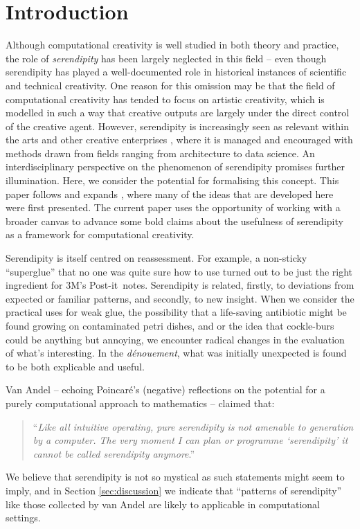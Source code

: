 \section{Introduction}

Although computational creativity is well studied in both theory and
practice, the role of \emph{serendipity} has been largely neglected
in this field -- even though serendipity has played a well-documented
role in historical instances of scientific and technical creativity.
One reason for this omission may be that the field of computational
creativity has tended to focus on artistic creativity, which is modelled in such a way that creative outputs are largely under the direct control of the creative agent.  However,  
serendipity is increasingly seen as relevant within the arts
\cite{mckay-serendipity} and other creative enterprises
\cite{kakko2009homo,engineering-serendipity}, where it is managed and
encouraged with methods drawn from fields ranging from architecture to data science.
%
An interdisciplinary perspective on the phenomenon of serendipity
promises further illumination.  Here, we consider the potential for
formalising this concept.  This paper follows and expands , where many of the ideas that are developed here were first presented.  The current paper uses the opportunity of working with a broader canvas to advance some bold claims about the usefulness of serendipity as a framework for computational creativity.

Serendipity is itself centred on reassessment.  For example, a non-sticky
``superglue'' that no one was quite sure how to use turned out to be
just the right ingredient for 3M's Post-it\texttrademark\ notes.
%
Serendipity is related, firstly, to deviations from expected or
familiar patterns, and secondly, to new insight.
%
When we consider the practical uses for weak glue, the possibility
that a life-saving antibiotic might be found growing on contaminated
petri dishes, and or the idea that cockle-burs could be anything but
annoying, we encounter radical changes in the evaluation of what's
interesting.  In the \emph{d\'enouement}, what was initially
unexpected is found to be both explicable and useful.

Van Andel \citeyear{van1994anatomy} -- echoing Poincar\'e's
\citeyear{poincare1910creation} (negative) reflections on the potential
for a purely computational approach to mathematics -- claimed that:
\begin{quote}
``\emph{Like all intuitive operating, pure serendipity is not amenable
    to generation by a computer.  The very moment I can plan or
    programme `serendipity' it cannot be called serendipity
    anymore}.'' \cite{van1994anatomy}
\end{quote}
We believe that serendipity is not so mystical as such statements
might seem to imply, and in Section \ref{sec:discussion} we indicate
that ``patterns of serendipity'' like those collected by van Andel
are likely to applicable in computational settings.

